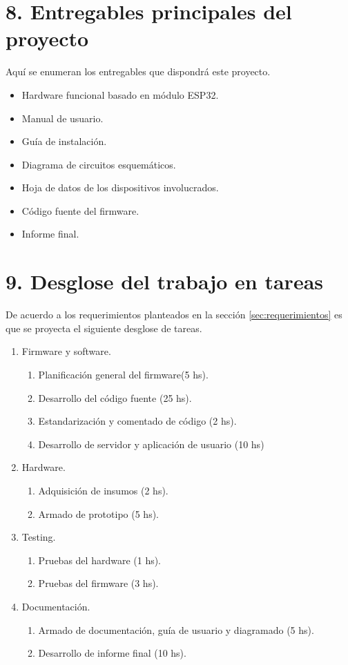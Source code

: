 \documentclass[
11pt, %
]{charter}
\begin{document}
\section{8. Entregables principales del proyecto}
\label{sec:entregables}

Aquí se enumeran los entregables que dispondrá este proyecto.
\begin{itemize}
	\item Hardware funcional basado en módulo ESP32.
	\item Manual de usuario.
	\item Guía de instalación.
	\item Diagrama de circuitos esquemáticos.
	\item Hoja de datos de los dispositivos involucrados.
	\item Código fuente del firmware.
	\item Informe final.

\end{itemize}

\section{9. Desglose del trabajo en tareas}
\label{sec:wbs}

De acuerdo a los requerimientos planteados en la sección \ref{sec:requerimientos} es que se proyecta el siguiente desglose de tareas.
\begin{enumerate}
\item Firmware y software.
	\begin{enumerate}
	\item Planificación general del firmware(5 hs).
	\item Desarrollo del código fuente (25 hs).
	\item Estandarización y comentado de código (2 hs).
	\item Desarrollo de servidor y aplicación de usuario (10 hs)
	\end{enumerate}
\item Hardware.
	\begin{enumerate}
	\item Adquisición de insumos (2 hs).
	\item Armado de prototipo (5 hs).
	\end{enumerate}
\item Testing.
	\begin{enumerate}
	\item Pruebas del hardware (1 hs).
	\item Pruebas del firmware (3 hs).
	\end{enumerate}
\item Documentación.
	\begin{enumerate}
	\item Armado de documentación, guía de usuario y diagramado (5 hs).
	\item Desarrollo de informe final (10 hs).
	\end{enumerate}
\end{enumerate}
\end{document}

